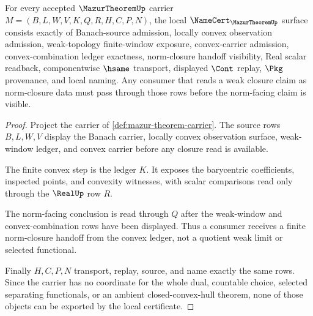 \begin{theorem}
\label{thm:mazur-theorem-namecert-obligations}
For every accepted $\MazurTheoremUp$ carrier $M=(B,L,W,V,K,Q,R,H,C,P,N)$, the local $\NameCert_{\MazurTheoremUp}$ surface consists exactly of Banach-source admission, locally convex observation admission, weak-topology finite-window exposure, convex-carrier admission, convex-combination ledger exactness, norm-closure handoff visibility, Real scalar readback, componentwise $\hsame$ transport, displayed $\Cont$ replay, $\Pkg$ provenance, and local naming. Any consumer that reads a weak closure claim as norm-closure data must pass through those rows before the norm-facing claim is visible.
\end{theorem}
\begin{proof}
Project the carrier of \autoref{def:mazur-theorem-carrier}. The source rows $B,L,W,V$ display the Banach carrier, locally convex observation surface, weak-window ledger, and convex carrier before any closure read is available.

The finite convex step is the ledger $K$. It exposes the barycentric coefficients, inspected points, and convexity witnesses, with scalar comparisons read only through the $\RealUp$ row $R$.

The norm-facing conclusion is read through $Q$ after the weak-window and convex-combination rows have been displayed. Thus a consumer receives a finite norm-closure handoff from the convex ledger, not a quotient weak limit or selected functional.

Finally $H,C,P,N$ transport, replay, source, and name exactly the same rows. Since the carrier has no coordinate for the whole dual, countable choice, selected separating functionals, or an ambient closed-convex-hull theorem, none of those objects can be exported by the local certificate.
\end{proof}


